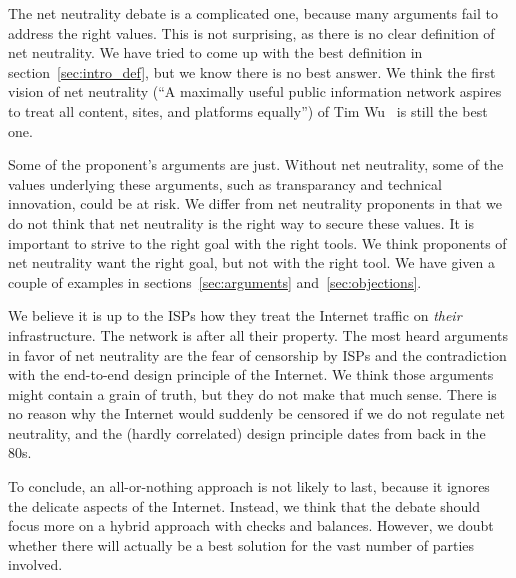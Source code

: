 The net neutrality debate is a complicated one, because many arguments fail to address the right values. This is not surprising, as there is no clear definition of net neutrality. We have tried to come up with the best definition in section~\ref{sec:intro_def}, but we know there is no best answer. We think the first vision of net neutrality (``A maximally useful public information network aspires to treat all content, sites, and platforms equally'') of Tim Wu~\cite{wu2003network} is still the best one.

Some of the proponent's arguments are just. Without net neutrality, some of the values underlying these arguments, such as transparancy and technical innovation, could be at risk. We differ from net neutrality proponents in that we do not think that net neutrality is the right way to secure these values. It is important to strive to the right goal with the right tools. We think proponents of net neutrality want the right goal, but not with the right tool. We have given a couple of examples in sections~\ref{sec:arguments} and~\ref{sec:objections}.

We believe it is up to the \acp{ISP} how they treat the Internet traffic on \emph{their} infrastructure. The network is after all their property. The most heard arguments in favor of net neutrality are the fear of censorship by \acp{ISP} and the contradiction with the end-to-end design principle of the Internet. We think those arguments might contain a grain of truth, but they do not make that much sense. There is no reason why the Internet would suddenly be censored if we do not regulate net neutrality, and the (hardly correlated) design principle dates from back in the 80s.

To conclude, an all-or-nothing approach is not likely to last, because it ignores the delicate aspects of the Internet. Instead, we think that the debate should focus more on a hybrid approach with checks and balances. However, we doubt whether there will actually be a best solution for the vast number of parties involved.